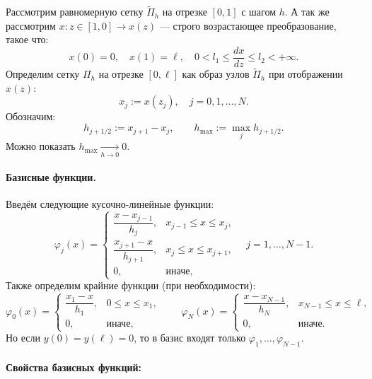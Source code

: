 Рассмотрим равномерную сетку \( \tilde{\Pi}_h \) на отрезке \( [0,1] \) с шагом \( h \).
А так же рассмотрим \( x: z \in [1, 0] \to x(z)  \) — строго возрастающее преобразование, такое что:
\[
x(0) = 0, \quad x(1) = \ell, \quad 0 < l_1 \le \frac{dx}{dz} \le l_2 < +\infty.
\]
Определим сетку \( \Pi_h \) на отрезке \( [0, \ell] \) как образ узлов \( \tilde{\Pi}_h \) при отображении \(x(z)\):
\[
x_j := x(z_j), \quad j = 0, 1, \dots, N.
\]
Обозначим:
\[
h_{j+1/2} := x_{j+1} - x_j, \qquad h_{\max} := \max_j h_{j+1/2}.
\]
Можно показать \( h_{\max} \xrightarrow[h \to 0]{} 0 \).

\paragraph{Базисные функции.} Введём следующие кусочно-линейные функции:
\[
\varphi_j(x) =
\begin{cases}
\dfrac{x - x_{j-1}}{h_j}, & x_{j-1} \le x \le x_j, \\
\dfrac{x_{j+1} - x}{h_{j+1}}, & x_j \le x \le x_{j+1}, \\
0, & \text{иначе},
\end{cases}
\quad j = 1, \dots, N-1.
\]
Также определим крайние функции (при необходимости):
\[
\varphi_0(x) =
\begin{cases}
\dfrac{x_1 - x}{h_1}, & 0 \le x \le x_1, \\
0, & \text{иначе},
\end{cases}
\qquad
\varphi_N(x) =
\begin{cases}
\dfrac{x - x_{N-1}}{h_N}, & x_{N-1} \le x \le \ell, \\
0, & \text{иначе}.
\end{cases}
\]
Но если \( y(0) = y(\ell) = 0 \), то в базис входят только \( \varphi_1, \dots, \varphi_{N-1} \).

\paragraph{Свойства базисных функций:}

